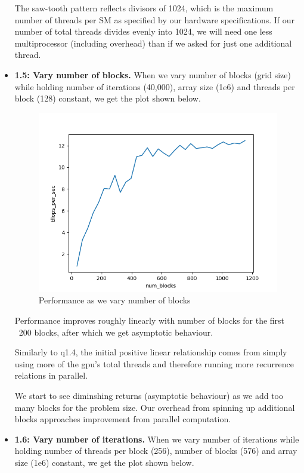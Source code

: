 \documentclass[12pt,letterpaper,twoside]{article}
\begin{document}
\begin{itemize}
    The saw-tooth pattern reflects divisors of 1024, which is the 
    maximum number of threads per SM as specified by our hardware
    specifications. If our number of total threads divides evenly 
    into 1024, we will need one less multiprocessor (including
    overhead) than if we asked for just one additional thread.
    

    \item \textbf{1.5: Vary number of blocks.} When we 
    vary number of blocks (grid size) while holding number of 
    iterations (40,000), array size (1e6) and threads per block 
    (128) constant, we get the plot shown below. 

    \begin{figure}[h]
        \center
        \includegraphics[scale=0.7]{q1_5.png}
        \caption{Performance as we vary number of blocks}
    \end{figure}

    Performance improves roughly linearly with number of blocks 
    for the first ~200 blocks, after which we get asymptotic 
    behaviour. 
    
    Similarly to q1.4, the initial positive linear relationship comes
    from simply using more of the gpu's total threads and therefore 
    running more recurrence relations in parallel.

    We start to see diminshing returns (asymptotic behaviour) as
    we add too many blocks for the problem size. Our overhead from
    spinning up additional blocks approaches improvement from 
    parallel computation.


    \item \textbf{1.6: Vary number of iterations.} When we 
    vary number of iterations while holding number of threads 
    per block (256), number of blocks (576) and array size (1e6) 
    constant, we get the plot shown below. 


\end{itemize}
\end{document}

